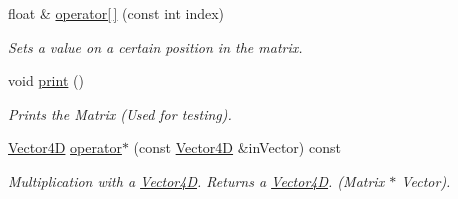 \begin{DoxyCompactItemize}
\mbox{\label{class_matrix4_d_aa0c987bc4acca97a4c87974f85c9cd0d}} 
float \& \mbox{\hyperlink{class_matrix4_d_aa0c987bc4acca97a4c87974f85c9cd0d}{operator\mbox{[}$\,$\mbox{]}}} (const int index)
\begin{DoxyCompactList}\small\item\em Sets a value on a certain position in the matrix. \end{DoxyCompactList}\item 
\mbox{\label{class_matrix4_d_a14f23e7b9335061719909c6151615af7}} 
void \mbox{\hyperlink{class_matrix4_d_a14f23e7b9335061719909c6151615af7}{print}} ()
\begin{DoxyCompactList}\small\item\em Prints the Matrix (Used for testing). \end{DoxyCompactList}\item 
\mbox{\label{class_matrix4_d_ad1e1d12058879f4bfc784f4ee5d8a5e1}} 
\mbox{\hyperlink{class_vector4_d}{Vector4D}} \mbox{\hyperlink{class_matrix4_d_ad1e1d12058879f4bfc784f4ee5d8a5e1}{operator$\ast$}} (const \mbox{\hyperlink{class_vector4_d}{Vector4D}} \&in\+Vector) const
\begin{DoxyCompactList}\small\item\em Multiplication with a \mbox{\hyperlink{class_vector4_d}{Vector4D}}. Returns a \mbox{\hyperlink{class_vector4_d}{Vector4D}}. (Matrix $\ast$ Vector). \end{DoxyCompactList}\end{DoxyCompactItemize}

